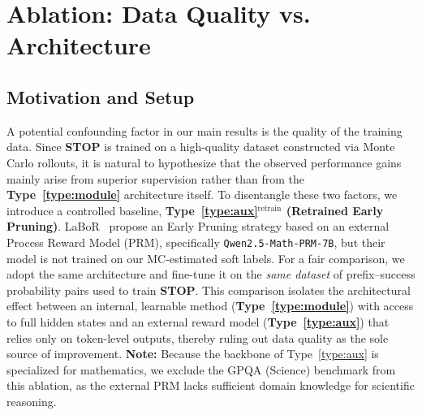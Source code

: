 \documentclass[11pt]{article}
\theoremstyle{plain}
\begin{document}
\section{Ablation: Data Quality vs. Architecture}
\label{app:labor_t}

\subsection{Motivation and Setup}
A potential confounding factor in our main results is the quality of the training data. Since \textbf{STOP} is trained on a high-quality dataset constructed via Monte Carlo rollouts, it is natural to hypothesize that the observed performance gains mainly arise from superior supervision rather than from the \textbf{Type~\ref{type:module}} architecture itself. To disentangle these two factors, we introduce a controlled baseline, \textbf{Type~\ref{type:aux}${}^{\text{retrain}}$ (Retrained Early Pruning)}. LaBoR~\cite{liao2025lost} propose an Early Pruning strategy based on an external Process Reward Model (PRM), specifically \texttt{Qwen2.5-Math-PRM-7B}, but their model is not trained on our MC-estimated soft labels. For a fair comparison, we adopt the same architecture and fine-tune it on the \emph{same dataset} of prefix--success probability pairs used to train \textbf{STOP}. This comparison isolates the architectural effect between an internal, learnable method (\textbf{Type~\ref{type:module}}) with access to full hidden states and an external reward model (\textbf{Type~\ref{type:aux}}) that relies only on token-level outputs, thereby ruling out data quality as the sole source of improvement. \textbf{Note:} Because the backbone of Type~\ref{type:aux} is specialized for mathematics, we exclude the GPQA (Science) benchmark from this ablation, as the external PRM lacks sufficient domain knowledge for scientific reasoning.
\end{document}
